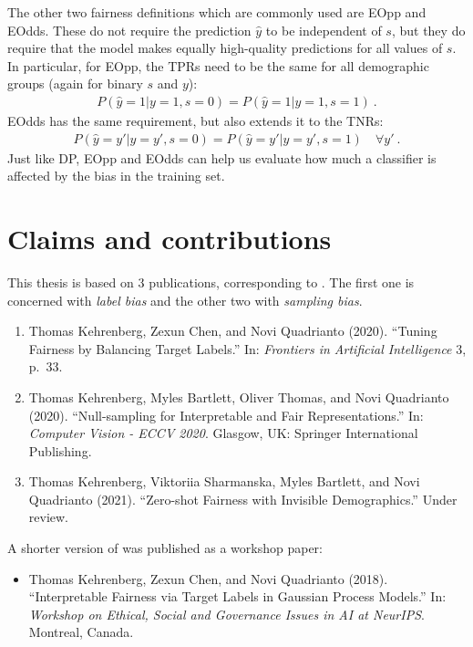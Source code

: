 The other two fairness definitions which are commonly used are \ac{EOpp} and \ac{EOdds}.
These do not require the prediction $\hat{y}$ to be independent of $s$,
but they do require that the model makes equally high-quality predictions for all values of $s$.
In particular, for \ac{EOpp}, the \acp{TPR} need to be the same for all demographic groups
(again for binary $s$ and $y$):
\begin{align}
  \label{eq:eopp-def}
  P(\hat{y}=1|y=1,s=0) = P(\hat{y}=1|y=1,s=1)~.
\end{align}
\ac{EOdds} has the same requirement, but also extends it to the \acp{TNR}:
\begin{align}
  P(\hat{y}=y'|y=y',s=0) = P(\hat{y}=y'|y=y',s=1)\quad\forall y'~.
  \label{eq:eodds-def}
\end{align}
Just like \ac{DP},
\ac{EOpp} and \ac{EOdds} can help us evaluate how much a classifier is affected by the bias in the training set.

\section{Claims and contributions}%
\label{sec:claims-contributions}
This thesis is based on 3 publications, corresponding to .
The first one is concerned with \emph{label bias} and the other two with \emph{sampling bias}.
\begin{enumerate}
  \item Thomas Kehrenberg, Zexun Chen, and Novi Quadrianto (2020). ``Tuning Fairness by Balancing Target Labels.''
    In: \emph{Frontiers in Artificial Intelligence} 3, p.\ 33.
    \citep{kehrenberg2020tuning}
  \item Thomas Kehrenberg, Myles Bartlett, Oliver Thomas, and Novi Quadrianto (2020).
    ``Null-sampling for Interpretable and Fair Representations.''
    In: \emph{Computer Vision - ECCV 2020}. Glasgow, UK: Springer International Publishing.
    \citep{kehrenberg2020nullsampling}
  \item Thomas Kehrenberg, Viktoriia Sharmanska, Myles Bartlett, and Novi Quadrianto (2021).
    ``Zero-shot Fairness with Invisible Demographics.''
    Under review.
    \citep{kehrenberg2020zeroshot}
\end{enumerate}
A shorter version of \citet{kehrenberg2020tuning} was published as a workshop paper:
\begin{itemize}
  \item Thomas Kehrenberg, Zexun Chen, and Novi Quadrianto (2018).
    ``Interpretable Fairness via Target Labels in Gaussian Process Models.''
    In: \emph{Workshop on Ethical, Social and Governance Issues in AI at NeurIPS}. Montreal, Canada.
\end{itemize}


